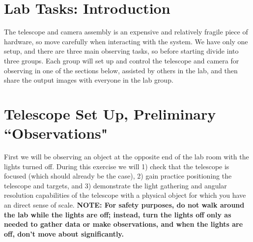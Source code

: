 \section{Lab Tasks: Introduction}

The telescope and camera assembly is an expensive and relatively fragile piece of hardware, so
move carefully when interacting with the system. We have only one setup, and there are
three main observing tasks, so before starting divide into three groups. Each group
will set up and control the telescope and camera for observing in one of the sections below, assisted by others in the lab, and
then share the output images with everyone in the lab group.

\section{Telescope Set Up, Preliminary ``Observations"}\label{sot:sec:setup}

First we will be observing an object at the opposite end of the lab room with the lights turned off. During this exercise we will 1) check that the telescope is focused (which should already be the case), 2) gain practice positioning the telescope and targets, and 3) demonstrate the light gathering and angular resolution capabilities of the telescope with a physical object for which you have an direct sense of scale. \textbf{NOTE: For safety purposes, do not walk around the
	lab while the lights are off; instead, turn the lights off only as needed to gather data
	or make observations, and when the lights are off, don’t move about significantly.}

